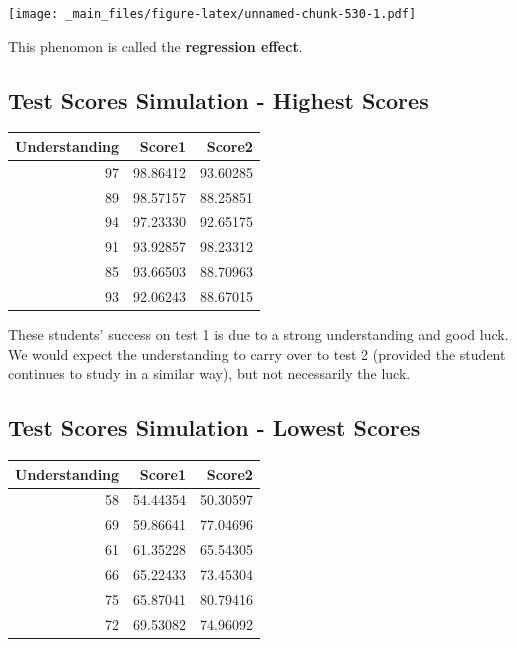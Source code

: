\documentclass[]{book}
\newenvironment{Shaded}{\begin{snugshade}}{\end{snugshade}}
\newcommand{\KeywordTok}[1]{\textcolor[rgb]{0.13,0.29,0.53}{\textbf{#1}}}
\newcommand{\OperatorTok}[1]{\textcolor[rgb]{0.81,0.36,0.00}{\textbf{#1}}}
\newcommand{\NormalTok}[1]{#1}
\begin{document}
\texttt{[image: \_main\_files/figure-latex/unnamed-chunk-530-1.pdf]}

This phenomon is called the \textbf{regression effect}.

\subsection{Test Scores Simulation - Highest
Scores}\label{test-scores-simulation---highest-scores}

\begin{Shaded}
\end{Shaded}

\begin{tabular}{r|r|r}
\hline
Understanding & Score1 & Score2\\
\hline
97 & 98.86412 & 93.60285\\
\hline
89 & 98.57157 & 88.25851\\
\hline
94 & 97.23330 & 92.65175\\
\hline
91 & 93.92857 & 98.23312\\
\hline
85 & 93.66503 & 88.70963\\
\hline
93 & 92.06243 & 88.67015\\
\hline
\end{tabular}

These students' success on test 1 is due to a strong understanding and
good luck. We would expect the understanding to carry over to test 2
(provided the student continues to study in a similar way), but not
necessarily the luck.

\subsection{Test Scores Simulation - Lowest
Scores}\label{test-scores-simulation---lowest-scores}

\begin{Shaded}
\end{Shaded}

\begin{tabular}{r|r|r}
\hline
Understanding & Score1 & Score2\\
\hline
58 & 54.44354 & 50.30597\\
\hline
69 & 59.86641 & 77.04696\\
\hline
61 & 61.35228 & 65.54305\\
\hline
66 & 65.22433 & 73.45304\\
\hline
75 & 65.87041 & 80.79416\\
\hline
72 & 69.53082 & 74.96092\\
\hline
\end{tabular}
\end{document}
